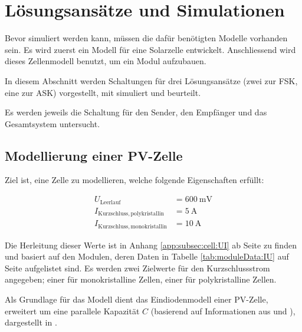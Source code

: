 \chapter{L\"osungsans\"atze und Simulationen}
\label{chap:simu}

Bevor  simuliert  werden  kann,  m\"ussen  die  daf\"ur  ben\"otigten  Modelle
vorhanden sein. Es  wird zuerst ein  Modell f\"ur eine  Solarzelle entwickelt.
Anschliessend wird dieses Zellenmodell benutzt, um ein Modul aufzubauen.

In  diesem Abschnitt  werden Schaltungen  f\"ur drei  L\"osungsans\"atze (zwei
zur  FSK, eine  zur  ASK)  vorgestellt, mit   simuliert  und
beurteilt.

Es werden  jeweils die  Schaltung f\"ur  den Sender,  den Empf\"anger  und das
Gesamtsystem untersucht.


\section{Modellierung einer PV-Zelle}
\label{sec:simu:model:cell}


Ziel ist, eine Zelle zu modellieren, welche folgende Eigenschaften erf\"ullt:

\begin{align}
    U_{\mathrm{Leerlauf}}                    &= \SI{600}{\milli\volt} \\
    I_{\mathrm{Kurzschluss, polykristallin}} &=  \SI{5}{\ampere}      \\
    I_{\mathrm{Kurzschluss, monokristallin}} &= \SI{10}{\ampere}
\end{align}

Die Herleitung  dieser Werte ist  in Anhang \ref{app:subsec:cell:UI}  ab Seite
\pageref{app:subsec:cell:UI}  zu finden  und  basiert auf  den Modulen,  deren
Daten in Tabelle \ref{tab:moduleData:IU} auf Seite \pageref{tab:moduleData:IU}
aufgelistet  sind.   Es  werden  zwei  Zielwerte  f\"ur  den  Kurzschlussstrom
angegeben;  einer f\"ur  monokristalline Zellen,  einer f\"ur  polykristalline
Zellen.

Als  Grundlage f\"ur  das  Modell dient  das  Eindiodenmodell einer  PV-Zelle,
erweitert  um  eine parallele  Kapazit\"at  $C$  (basierend auf  Informationen
aus  \cite{ref:solar:scofield} und  \cite{ref:solar:friesen}), dargestellt  in
.


